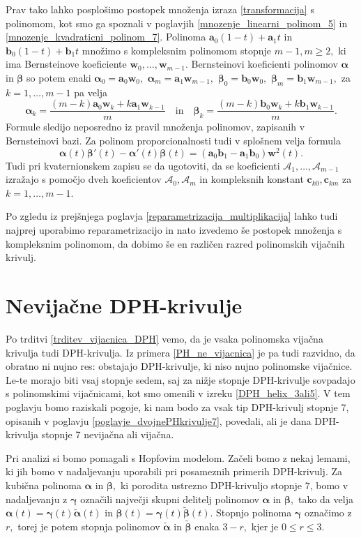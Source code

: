 \documentclass[12pt,a4paper,twoside]{article}
\theoremstyle{definition} %
\theoremstyle{plain} %
\theoremstyle{primerstyle}
\numberwithin{equation}{section}  %
\newcommand{\aV}{\mathbf{a}}
\newcommand{\bV}{\mathbf{b}}
\newcommand{\cV}{\mathbf{c}}
\newcommand{\wV}{\mathbf{w}}
\newcommand{\AQ}{\mathcal{A}}
\newcommand{\balpha}{\boldsymbol \alpha}
\newcommand{\bbeta}{\boldsymbol \beta}
\newcommand{\bgamma}{\boldsymbol \gamma}
\newcommand{\btalpha}{\tilde{\boldsymbol \alpha}}
\newcommand{\btbeta}{\tilde{\boldsymbol \beta}}
\begin{document}
Prav tako lahko posplošimo postopek množenja izraza \eqref{transformacija} s polinomom, kot smo ga spoznali v poglavjih \ref{mnozenje_linearni_polinom_5} in \ref{mnozenje_kvadraticni_polinom_7}. Polinoma $\aV_0(1-t)+\aV_1t$ in $\bV_0(1-t)+\bV_1t$ množimo s kompleksnim polinomom stopnje $m-1,m\geq2,$ ki ima Bernsteinove koeficiente $\wV_0,\dots,\wV_{m-1}.$ Bernsteinovi koeficienti polinomov $\balpha$ in $\bbeta$ so potem enaki $\balpha_0=\aV_0\wV_0,$ $\balpha_m=\aV_1\wV_{m-1},$ $\bbeta_0=\bV_0\wV_0,$ $\bbeta_m=\bV_1\wV_{m-1},$ za $k=1,\dots,m-1$ pa velja
\begin{equation*}
	\balpha_k=\frac{(m-k)\aV_0\wV_k+k\aV_1\wV_{k-1}}{m}\quad\text{in}\quad\bbeta_k=\frac{(m-k)\bV_0\wV_k+k\bV_1\wV_{k-1}}{m}.
\end{equation*}
Formule sledijo neposredno iz pravil množenja polinomov, zapisanih v Bernsteinovi bazi. Za polinom proporcionalnosti tudi v splošnem velja formula $$\balpha(t)\bbeta'(t)-\balpha'(t)\bbeta(t)=(\aV_0\bV_1-\aV_1\bV_0)\wV^2(t).$$ Tudi pri kvaternionskem zapisu se da ugotoviti, da se koeficienti $\AQ_1,\dots,\AQ_{m-1}$ izražajo s pomočjo dveh koeficientov $\AQ_0,\AQ_m$ in kompleksnih konstant $\cV_{k0},\cV_{km}$ za $k=1,\dots,m-1.$

Po zgledu iz prejšnjega poglavja \ref{reparametrizacija_multiplikacija} lahko tudi najprej uporabimo reparametrizacijo in nato izvedemo še postopek množenja s kompleksnim polinomom, da dobimo še en različen razred polinomskih vijačnih krivulj.
\clearpage

\section{Nevijačne DPH-krivulje}
\label{poglavje_nevijacne}

Po trditvi \ref{trditev_vijacnica_DPH} vemo, da je vsaka polinomska vijačna krivulja tudi DPH-krivulja. Iz primera \ref{PH_ne_vijacnica} je pa tudi razvidno, da obratno ni nujno res: obstajajo DPH-krivulje, ki niso nujno polinomske vijačnice. Le-te morajo biti vsaj stopnje sedem, saj za nižje stopnje DPH-krivulje sovpadajo s polinomskimi vijačnicami, kot smo omenili v izreku \ref{DPH_helix_3ali5}. %
V tem poglavju bomo raziskali pogoje, ki nam bodo za vsak tip DPH-krivulj stopnje 7, opisanih v poglavju \ref{poglavje_dvojnePHkrivulje7}, povedali, ali je dana DPH-krivulja stopnje 7 nevijačna ali vijačna.

Pri analizi si bomo pomagali s Hopfovim modelom. Začeli bomo z nekaj lemami, ki jih bomo v nadaljevanju uporabili pri posameznih primerih DPH-krivulj. Za kubična polinoma $\balpha$ in $\bbeta,$ ki porodita ustrezno DPH-krivuljo stopnje 7, bomo v nadaljevanju z $\bgamma$ označili največji skupni delitelj polinomov $\balpha$ in $\bbeta,$ tako da velja $\balpha(t)=\bgamma(t)\btalpha(t)$ in $\bbeta(t)=\bgamma(t)\btbeta(t).$ Stopnjo polinoma $\bgamma$ označimo z $r,$ torej je potem stopnja polinomov $\btalpha$ in $\btbeta$ enaka $3-r,$ kjer je $0\leq r \leq 3.$
\end{document}
